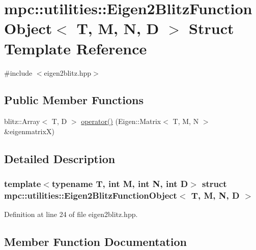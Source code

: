 \hypertarget{structmpc_1_1utilities_1_1_eigen2_blitz_function_object}{}\section{mpc\+:\+:utilities\+:\+:Eigen2\+Blitz\+Function\+Object$<$ T, M, N, D $>$ Struct Template Reference}
\label{structmpc_1_1utilities_1_1_eigen2_blitz_function_object}


{\ttfamily \#include $<$eigen2blitz.\+hpp$>$}

\subsection*{Public Member Functions}
\begin{DoxyCompactItemize}
\item 
blitz\+::\+Array$<$ T, D $>$ \mbox{\hyperlink{structmpc_1_1utilities_1_1_eigen2_blitz_function_object_a4d46d6becef7fed9194cdf654c44dfdc}{operator()}} (Eigen\+::\+Matrix$<$ T, M, N $>$ \&eigenmatrixX)
\end{DoxyCompactItemize}


\subsection{Detailed Description}
\subsubsection*{template$<$typename T, int M, int N, int D$>$\newline
struct mpc\+::utilities\+::\+Eigen2\+Blitz\+Function\+Object$<$ T, M, N, D $>$}



Definition at line 24 of file eigen2blitz.\+hpp.



\subsection{Member Function Documentation}
\mbox{\label{structmpc_1_1utilities_1_1_eigen2_blitz_function_object_a4d46d6becef7fed9194cdf654c44dfdc}} 
